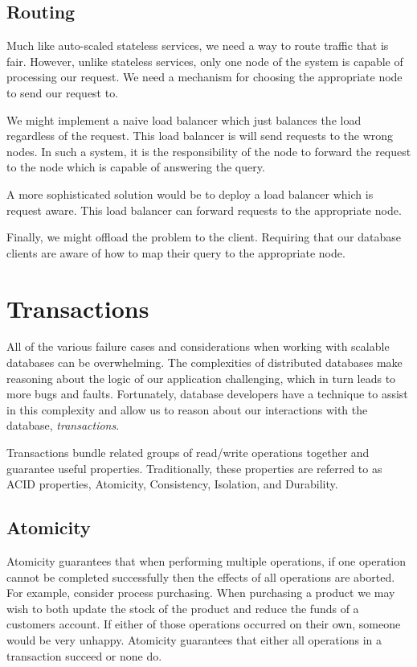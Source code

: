 \subsection{Routing}

Much like auto-scaled stateless services,
we need a way to route traffic that is fair.
However, unlike stateless services,
only one node of the system is capable of processing our request.
We need a mechanism for choosing the appropriate node to send our request to.

We might implement a naive load balancer which just balances the load regardless of the request.
This load balancer is will send requests to the wrong nodes.
In such a system, it is the responsibility of the node to forward the request to the node which is capable of answering the query.

A more sophisticated solution would be to deploy a load balancer which is request aware.
This load balancer can forward requests to the appropriate node.

Finally, we might offload the problem to the client.
Requiring that our database clients are aware of how to map their query to the appropriate node.

\section{Transactions}

All of the various failure cases and considerations when working with scalable databases can be overwhelming.
The complexities of distributed databases make reasoning about the logic of our application challenging,
which in turn leads to more bugs and faults.
Fortunately, database developers have a technique to assist in this complexity and allow us to reason about our interactions with the database, \textsl{transactions}.

Transactions bundle related groups of read/write operations together and guarantee useful properties.
Traditionally, these properties are referred to as ACID properties, Atomicity, Consistency, Isolation, and Durability.

\subsection{Atomicity}
Atomicity guarantees that when performing multiple operations,
if one operation cannot be completed successfully then the effects of all operations are aborted.
For example,
consider process purchasing.
When purchasing a product we may wish to both update the stock of the product and reduce the funds of a customers account.
If either of those operations occurred on their own,
someone would be very unhappy.
Atomicity guarantees that either all operations in a transaction succeed or none do.

